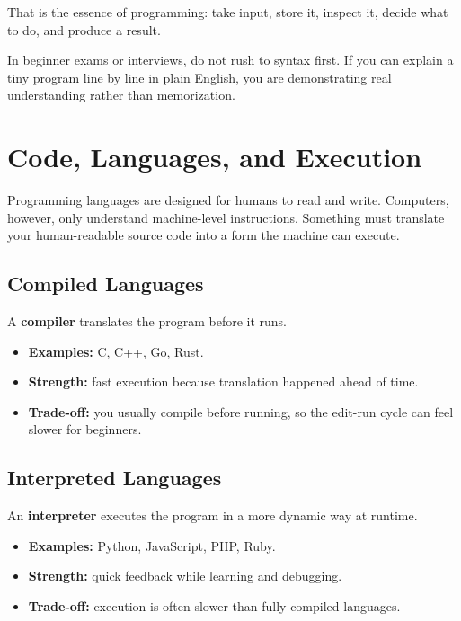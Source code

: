 \documentclass[12pt, a4paper, oneside]{book}
\begin{document}
That is the essence of programming: take input, store it, inspect it, decide what to do, and produce a result.

\begin{examtipbox}
In beginner exams or interviews, do not rush to syntax first. If you can explain a tiny program line by line in plain English, you are demonstrating real understanding rather than memorization.
\end{examtipbox}

\section{Code, Languages, and Execution}

Programming languages are designed for humans to read and write. Computers, however, only understand machine-level instructions. Something must translate your human-readable source code into a form the machine can execute.

\subsection{Compiled Languages}
A \textbf{compiler} translates the program before it runs.

\begin{itemize}[leftmargin=2em]
    \item \textbf{Examples:} C, C++, Go, Rust.
    \item \textbf{Strength:} fast execution because translation happened ahead of time.
    \item \textbf{Trade-off:} you usually compile before running, so the edit-run cycle can feel slower for beginners.
\end{itemize}

\subsection{Interpreted Languages}
An \textbf{interpreter} executes the program in a more dynamic way at runtime.

\begin{itemize}[leftmargin=2em]
    \item \textbf{Examples:} Python, JavaScript, PHP, Ruby.
    \item \textbf{Strength:} quick feedback while learning and debugging.
    \item \textbf{Trade-off:} execution is often slower than fully compiled languages.
\end{itemize}
\end{document}
